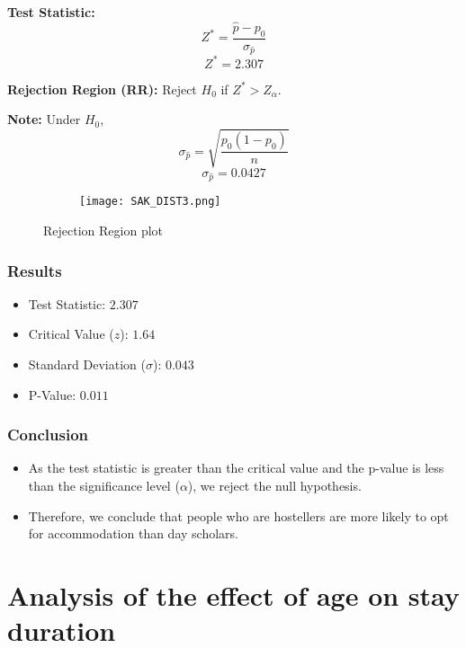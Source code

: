 \documentclass[oneside]{book}
\begin{document}
\textbf{Test Statistic:}
\[
Z^* = \frac{\hat{p} - p_0}{\sigma_{\hat{p}}}
\]
\[
Z^* =  2.307
\]

\textbf{Rejection Region (RR):}
Reject \( H_0 \) if \( Z^* > Z_\alpha \).

\textbf{Note:} Under \( H_0 \),
\[
\sigma_{\hat{p}} = \sqrt{\frac{p_0(1 - p_0)}{n}}
\]
\[
\sigma_{\hat{p}} = 0.0427
\]
\begin{figure}[h!]
    \centering
    \begin{subfigure}{0.45\textwidth} %
        \centering
        \texttt{[image: SAK\_DIST3.png]}
        \label{fig:seg_hist}
    \end{subfigure}
    \caption{Rejection Region plot}
    \label{fig: Rejection region plot}
\end{figure}



\subsection{Results}
\begin{itemize}
    \item Test Statistic: \(2.307\)
    \item Critical Value (\(z\)): \(1.64\)
    \item Standard Deviation (\(\sigma\)): \(0.043\)
    \item P-Value: \(0.011\)
\end{itemize}

\subsection{Conclusion}
\begin{itemize}
    \item As the test statistic is greater than the critical value and the p-value is less than the significance level (\(\alpha\)), we reject the null hypothesis.
    \item Therefore, we conclude that people who are hostellers are more likely to opt for accommodation than day scholars.
\end{itemize}


\chapter{Analysis of the effect of age on stay duration}
\end{document}
